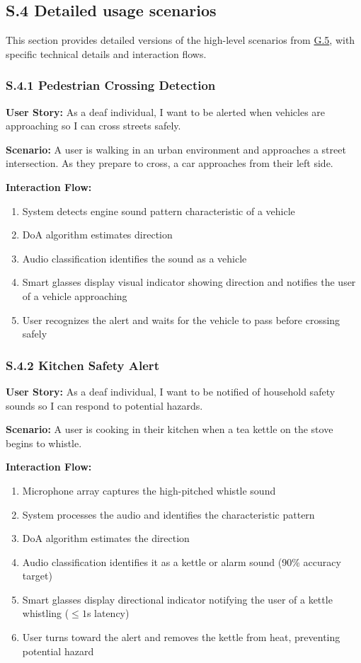 \documentclass[12pt]{article}
\theoremstyle{definition}
\begin{document}
\subsection{S.4 Detailed usage scenarios}

This section provides detailed versions of the high-level scenarios from
\hyperref[item: G.5]{G.5}, with specific technical details and interaction
flows.

\subsubsection{S.4.1 Pedestrian Crossing Detection}
\textbf{User Story:} As a deaf individual, I want to be alerted when vehicles
are approaching so I can cross streets safely.

\textbf{Scenario:} A user is walking in an urban environment and approaches a
street intersection. As they prepare to cross, a car approaches from their left
side.

\textbf{Interaction Flow:}
\begin{enumerate}
    \item System detects engine sound pattern characteristic of a vehicle
    \item DoA algorithm estimates direction
    \item Audio classification identifies the sound as a vehicle
    \item Smart glasses display visual indicator showing direction and notifies
    the user of a vehicle approaching
    \item User recognizes the alert and waits for the vehicle to pass before
    crossing safely
\end{enumerate}

\subsubsection{S.4.2 Kitchen Safety Alert}
\textbf{User Story:} As a deaf individual, I want to be notified of household
safety sounds so I can respond to potential hazards.

\textbf{Scenario:} A user is cooking in their kitchen when a tea kettle on the
stove begins to whistle.

\textbf{Interaction Flow:}
\begin{enumerate}
    \item Microphone array captures the high-pitched whistle sound
    \item System processes the audio and identifies the characteristic pattern
    \item DoA algorithm estimates the direction
    \item Audio classification identifies it as a kettle or alarm sound (90\%
    accuracy target)
    \item Smart glasses display directional indicator notifying the user of a
    kettle whistling ($\leq 1$s latency)
    \item User turns toward the alert and removes the kettle from heat,
    preventing potential hazard
\end{enumerate}
\end{document}
